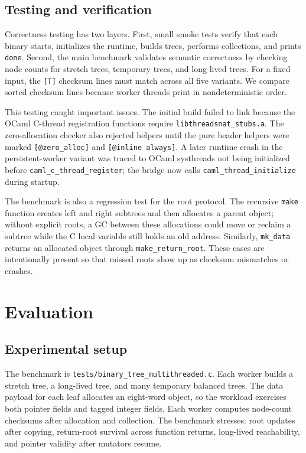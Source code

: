 \documentclass[11pt,a4paper]{article}
\begin{document}
\subsection{Testing and verification}

Correctness testing has two layers.  First, small smoke tests verify that each
binary starts, initializes the runtime, builds trees, performs collections, and
prints \texttt{done}.  Second, the main benchmark validates semantic
correctness by checking node counts for stretch trees, temporary trees, and
long-lived trees.  For a fixed input, the \texttt{[T]} checksum lines must match
across all five variants.  We compare sorted checksum lines because worker
threads print in nondeterministic order.

This testing caught important issues.  The initial build failed to link because
the OCaml C-thread registration functions require
\texttt{libthreadsnat\_stubs.a}.  The zero-allocation checker also rejected
helpers until the pure header helpers were marked \texttt{[@zero\_alloc]} and
\texttt{[@inline always]}.  A later runtime crash in the persistent-worker
variant was traced to OCaml systhreads not being initialized before
\texttt{caml\_c\_thread\_register}; the bridge now calls
\texttt{caml\_thread\_initialize} during startup.

The benchmark is also a regression test for the root protocol.  The recursive
\texttt{make} function creates left and right subtrees and then allocates a
parent object; without explicit roots, a GC between these allocations could
move or reclaim a subtree while the C local variable still holds an old address.
Similarly, \texttt{mk\_data} returns an allocated object through
\texttt{make\_return\_root}.  These cases are intentionally present so that
missed roots show up as checksum mismatches or crashes.

\section{Evaluation}
\label{sec:evaluation}

\subsection{Experimental setup}

The benchmark is \texttt{tests/binary\_tree\_multithreaded.c}.  Each worker
builds a stretch tree, a long-lived tree, and many temporary balanced trees.
The data payload for each leaf allocates an eight-word object, so the workload
exercises both pointer fields and tagged integer fields.  Each worker computes
node-count checksums after allocation and collection.  The benchmark stresses:
root updates after copying, return-root survival across function returns,
long-lived reachability, and pointer validity after mutators resume.
\end{document}
